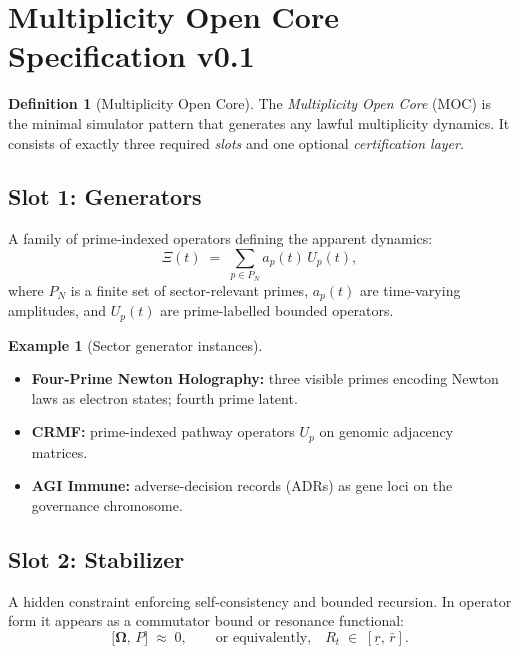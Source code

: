\documentclass[12pt,a4paper]{article}
\theoremstyle{plain}
\theoremstyle{definition}
\newtheorem{definition}[theorem]{Definition}
\newtheorem{example}[theorem]{Example}
\theoremstyle{remark}
\begin{document}
\section{Multiplicity Open Core Specification v0.1}
\label{sec:moc}

\begin{definition}[Multiplicity Open Core]
The \emph{Multiplicity Open Core} (MOC) is the minimal simulator
pattern that generates any lawful multiplicity dynamics. It consists
of exactly three required \emph{slots} and one optional
\emph{certification layer}.
\end{definition}

\subsection{Slot 1: Generators}
\label{sec:generators}

A family of prime-indexed operators defining the apparent dynamics:
\begin{equation}
  \Xi(t) \;=\; \sum_{p \in P_N} a_p(t)\, U_p(t),
  \label{eq:generators}
\end{equation}
where $P_N$ is a finite set of sector-relevant primes, $a_p(t)$ are
time-varying amplitudes, and $U_p(t)$ are prime-labelled bounded operators.

\begin{example}[Sector generator instances]\hfill
\begin{itemize}
  \item \textbf{Four-Prime Newton Holography:} three visible primes
        encoding Newton laws as electron states; fourth prime latent.
  \item \textbf{CRMF:} prime-indexed pathway operators $U_p$ on genomic
        adjacency matrices.
  \item \textbf{AGI Immune:} adverse-decision records (ADRs) as gene loci
        on the governance chromosome.
\end{itemize}
\end{example}

\subsection{Slot 2: Stabilizer}
\label{sec:stabilizer}

A hidden constraint enforcing self-consistency and bounded recursion.
In operator form it appears as a commutator bound or resonance functional:
\begin{equation}
  \bigl[\boldsymbol{\Omega},\, P\bigr] \;\approx\; 0,
  \qquad \text{or equivalently,} \quad
  R_t \;\in\; [\underline{r},\, \bar{r}].
  \label{eq:stabilizer}
\end{equation}
\end{document}
